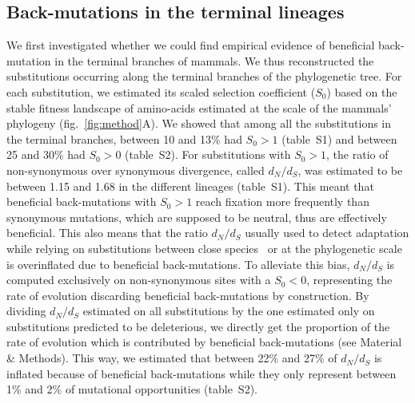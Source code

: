 \documentclass{article}
\newcommand{\dn}{d_N}
\newcommand{\ds}{d_S}
\newcommand{\dnds}{\dn / \ds}
\newcommand{\Sphy}{S_{0}}
\begin{document}
    \subsection*{Back-mutations in the terminal lineages}
    We first investigated whether we could find empirical evidence of beneficial back-mutation in the terminal branches of mammals.
    We thus reconstructed the substitutions occurring along the terminal branches of the phylogenetic tree.
    For each substitution, we estimated its scaled selection coefficient ($\Sphy$) based on the stable fitness landscape of amino-acids estimated at the scale of the mammals' phylogeny (fig.~\ref{fig:method}A).
    We showed that among all the substitutions in the terminal branches, between 10 and 13\% had $\Sphy > 1$ (table~S1) and between 25 and 30\% had $\Sphy > 0$ (table~S2).
    For substitutions with $\Sphy > 1$, the ratio of non-synonymous over synonymous divergence, called $\dnds$, was estimated to be between 1.15 and 1.68 in the different lineages (table~S1).
    This meant that beneficial back-mutations with $\Sphy > 1$ reach fixation more frequently than synonymous mutations, which are supposed to be neutral, thus are effectively beneficial.
    This also means that the ratio $\dnds$ usually used to detect adaptation while relying on substitutions between close species~\cite{mcdonald_adaptative_1991, galtier_adaptive_2016} or at the phylogenetic scale~\cite{goldman_codonbased_1994, yang_codonsubstitution_2002} is overinflated due to beneficial back-mutations.
    To alleviate this bias, $\dnds$ is computed exclusively on non-synonymous sites with a $\Sphy < 0$, representing the rate of evolution discarding beneficial back-mutations by construction.
    By dividing $\dnds$ estimated on all substitutions by the one estimated only on substitutions predicted to be deleterious, we directly get the proportion of the rate of evolution which is contributed by beneficial back-mutations (see Material \& Methods).
    This way, we estimated that between 22\% and 27\% of $\dnds$ is inflated because of beneficial back-mutations while they only represent between 1\% and 2\% of mutational opportunities (table~S2).
\end{document}
